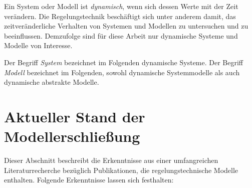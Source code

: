 Ein System oder Modell ist \textit{dynamisch}, wenn sich dessen Werte mit der Zeit verändern. Die Regelungstechnik beschäftigt sich unter anderem damit, das zeitveränderliche Verhalten von Systemen und Modellen zu untersuchen und zu beeinflussen. Demzufolge sind für diese Arbeit nur dynamische Systeme und Modelle von Interesse.

Der Begriff \textit{System} bezeichnet im Folgenden dynamische Systeme. Der Begriff \textit{Modell} bezeichnet im Folgenden, sowohl dynamische Systemmodelle als auch dynamische abstrakte Modelle.

\section{Aktueller Stand der Modellerschließung}%
\label{Ch:Vorbetrachtung:Sec:CurrentState}
Dieser Abschnitt beschreibt die Erkenntnisse aus einer umfangreichen Literaturrecherche bezüglich Publikationen, die regelungstechnische Modelle enthalten. Folgende Erkenntnisse lassen sich festhalten:

